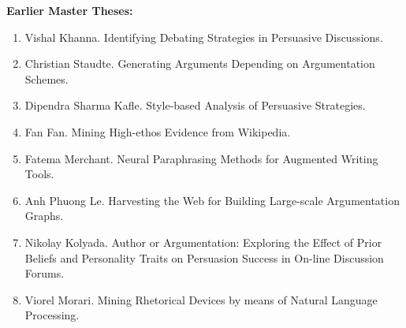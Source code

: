 \textbf{Earlier Master Theses:}
\begin{enumerate}
\item Vishal Khanna. Identifying Debating Strategies in Persuasive Discussions.
\item Christian Staudte. Generating Arguments Depending on Argumentation Schemes.
\item Dipendra Sharma Kafle. Style-based Analysis of Persuasive Strategies.
\item Fan Fan. Mining High-ethos Evidence from Wikipedia.
\item Fatema Merchant. Neural Paraphrasing Methods for Augmented Writing Tools.
\item Anh Phuong Le. Harvesting the Web for Building Large-scale Argumentation Graphs.
\item Nikolay Kolyada. Author or Argumentation: Exploring the Effect of Prior Beliefs and Personality Traits on Persuasion Success in On-line Discussion Forums.
\item Viorel Morari. Mining Rhetorical Devices by means of Natural Language Processing.
\end{enumerate}

